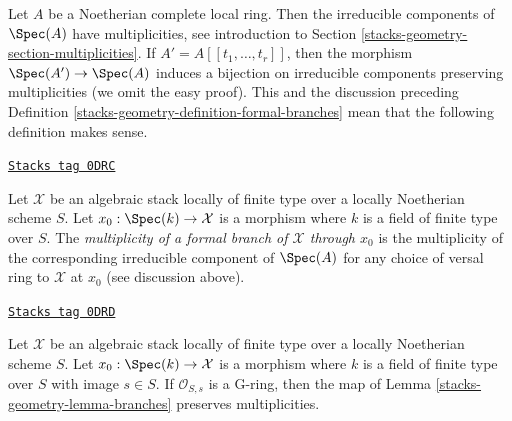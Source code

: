 Let $A$ be a Noetherian complete local ring. Then the irreducible
components of $\Spec(A)$ have multiplicities, see
introduction to Section \ref{stacks-geometry-section-multiplicities}.
If $A' = A[[t_1, \ldots, t_r]]$, then the morphism
$\Spec(A') \to \Spec(A)$ induces a bijection on irreducible
components preserving multiplicities (we omit the easy proof).
This and the discussion preceding
Definition \ref{stacks-geometry-definition-formal-branches}
mean that the following definition makes sense.

\begin{definition}
\label{stacks-geometry-definition-multiplicity-formal-branches}
\href{https://stacks.math.columbia.edu/tag/0DRC}{\texttt{Stacks tag 0DRC}}

Let $\mathcal{X}$ be an algebraic stack locally of finite type
over a locally Noetherian scheme $S$. Let $x_0 : \Spec(k) \to \mathcal{X}$
is a morphism where $k$ is a field of finite type over $S$.
The {\it multiplicity of a formal branch of $\mathcal{X}$ through $x_0$}
is the multiplicity of the corresponding irreducible component of
$\Spec(A)$ for any choice of versal ring to $\mathcal{X}$ at $x_0$
(see discussion above).
\end{definition}

\begin{lemma}
\label{stacks-geometry-lemma-branches-multiplicity}
\href{https://stacks.math.columbia.edu/tag/0DRD}{\texttt{Stacks tag 0DRD}}

Let $\mathcal{X}$ be an algebraic stack locally of finite type
over a locally Noetherian scheme $S$. Let $x_0 : \Spec(k) \to \mathcal{X}$
is a morphism where $k$ is a field of finite type over $S$ with
image $s \in S$. If $\mathcal{O}_{S, s}$ is a G-ring, then
the map of Lemma \ref{stacks-geometry-lemma-branches} preserves multiplicities.
\end{lemma}

